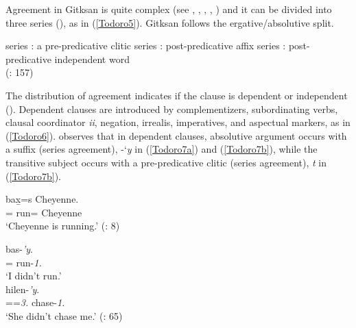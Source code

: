\documentclass[output=paper]{langscibook}
\begin{document}
Agreement in Gitksan is quite complex (see \citealt{davis2011a}, \citealt{davis2015a}, \citealt{forbes2017a}, \citeyear{forbes2018a}, \citeyear{forbes2019a}) and it can be divided into three series (\citealt{rigsby1986a}), as in (\ref{Todoro5}). Gitksan follows the ergative/absolutive split.\largerpage


\begin{exe}
\ex \label{Todoro5}
\begin{xlist}
\ex \label{Todoro5a}
series {\seriesI}: a pre-predicative clitic 
\ex \label{Todoro5b}
series {\seriesII}: post-predicative affix 
\ex \label{Todoro5c}
series {\seriesIII}: post-predicative independent word \\ 
(\citealt{davis2015a}: 157)
\end{xlist}
\end{exe}

The distribution of agreement indicates if the clause is dependent or independent (\citealt{rigsby1986a}). Dependent clauses are introduced by complementizers, subordinating verbs, clausal coordinator \textit{ii}, negation, irrealis, imperatives, and aspectual markers, as in (\ref{Todoro6}). \citet{forbes2019a} observes that in dependent clauses, absolutive argument occurs with a suffix (series {\seriesII} agreement), -‘\emph{y} in (\ref{Todoro7a}) and (\ref{Todoro7b}), while the transitive subject occurs with a pre-predicative clitic (series {\seriesI} agreement),  \emph{t} in (\ref{Todoro7b}). 


\begin{exe}
\ex \label{Todoro6}
 {bax̱=s} {Cheyenne.} \\
{\prog}={\cn} run={\pn} Cheyenne \\
\glt `Cheyenne is running.' (\citealt{schwan2019a}: 8)

\ex \label{Todoro7}
\begin{xlist}

\ex \label{Todoro7a} 
 {bas-\textit{'y}.}\\
    {\glossNeg}={\foc} run-\textit{1{\sg}.{\seriesII}}\\
\glt `I didn't run.’  \citep[65]{forbes2019a}\\

\ex \label{Todoro7b}
 hilen-\textit{'y}.\\
    {\glossNeg}={\foc}=\textit{3.{\seriesI}} chase-\textit{1{\sg}.{\seriesII}} \\
\glt `She didn't chase me.’ (\citealt{forbes2019a}: 65) \\

\end{xlist}
\end{exe}
\end{document}
